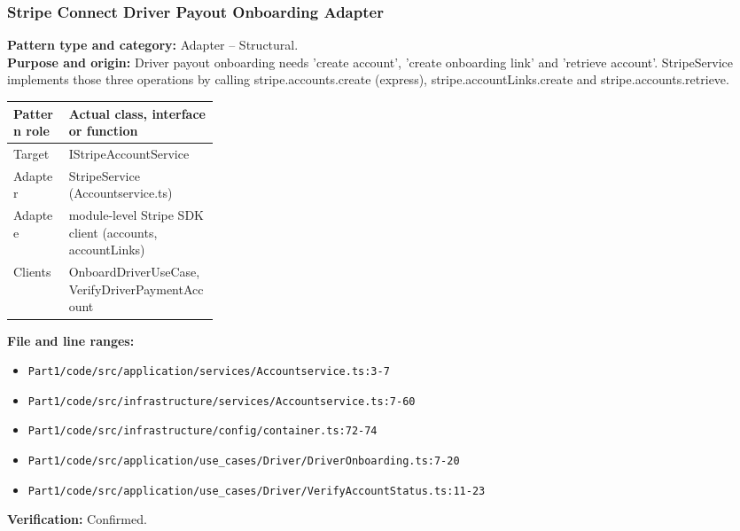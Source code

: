 \documentclass[11pt,a4paper]{article}
\begin{document}
\subsubsection*{Stripe Connect Driver Payout Onboarding Adapter}
\textbf{Pattern type and category:} Adapter -- Structural.\\
\textbf{Purpose and origin:} Driver payout onboarding needs 'create account', 'create onboarding link' and 'retrieve account'. StripeService implements those three operations by calling stripe.accounts.create (express), stripe.accountLinks.create and stripe.accounts.retrieve.

\noindent\begin{tabularx}{\linewidth}{@{}P{0.27\linewidth}Y@{}}
\toprule Pattern role & Actual class, interface or function \\ \midrule
Target & IStripeAccountService \\
Adapter & StripeService (Accountservice.ts) \\
Adaptee & module-level Stripe SDK client (accounts, accountLinks) \\
Clients & OnboardDriverUseCase, VerifyDriverPaymentAccount \\
\bottomrule
\end{tabularx}

\noindent\textbf{File and line ranges:}\begin{itemize}\setlength\itemsep{0pt}\item \texttt{Part1/\allowbreak{}code/\allowbreak{}src/\allowbreak{}application/\allowbreak{}services/\allowbreak{}Accountservice.\allowbreak{}ts:3-7}\item \texttt{Part1/\allowbreak{}code/\allowbreak{}src/\allowbreak{}infrastructure/\allowbreak{}services/\allowbreak{}Accountservice.\allowbreak{}ts:7-60}\item \texttt{Part1/\allowbreak{}code/\allowbreak{}src/\allowbreak{}infrastructure/\allowbreak{}config/\allowbreak{}container.\allowbreak{}ts:72-74}\item \texttt{Part1/\allowbreak{}code/\allowbreak{}src/\allowbreak{}application/\allowbreak{}use\_\allowbreak{}cases/\allowbreak{}Driver/\allowbreak{}DriverOnboarding.\allowbreak{}ts:7-20}\item \texttt{Part1/\allowbreak{}code/\allowbreak{}src/\allowbreak{}application/\allowbreak{}use\_\allowbreak{}cases/\allowbreak{}Driver/\allowbreak{}VerifyAccountStatus.\allowbreak{}ts:11-23}\end{itemize}
\noindent\textbf{Verification:} Confirmed.
\end{document}
